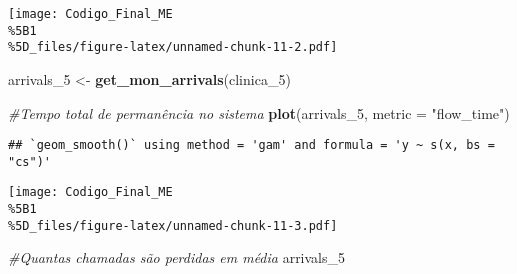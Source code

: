 \documentclass[
]{article}
\newenvironment{Shaded}{\begin{snugshade}}{\end{snugshade}}
\newcommand{\AttributeTok}[1]{\textcolor[rgb]{0.13,0.29,0.53}{#1}}
\newcommand{\CommentTok}[1]{\textcolor[rgb]{0.56,0.35,0.01}{\textit{#1}}}
\newcommand{\FunctionTok}[1]{\textcolor[rgb]{0.13,0.29,0.53}{\textbf{#1}}}
\newcommand{\NormalTok}[1]{#1}
\newcommand{\OtherTok}[1]{\textcolor[rgb]{0.56,0.35,0.01}{#1}}
\newcommand{\StringTok}[1]{\textcolor[rgb]{0.31,0.60,0.02}{#1}}
\begin{document}
\texttt{[image: Codigo\_Final\_ME\\\%5B1\\\%5D\_files/figure-latex/unnamed-chunk-11-2.pdf]}

\begin{Shaded}
\begin{Highlighting}[]
\NormalTok{arrivals\_5 }\OtherTok{\textless{}{-}} \FunctionTok{get\_mon\_arrivals}\NormalTok{(clinica\_5)}

\CommentTok{\#Tempo total de permanência no sistema}
\FunctionTok{plot}\NormalTok{(arrivals\_5, }\AttributeTok{metric =} \StringTok{"flow\_time"}\NormalTok{)  }
\end{Highlighting}
\end{Shaded}

\begin{verbatim}
## `geom_smooth()` using method = 'gam' and formula = 'y ~ s(x, bs = "cs")'
\end{verbatim}

\texttt{[image: Codigo\_Final\_ME\\\%5B1\\\%5D\_files/figure-latex/unnamed-chunk-11-3.pdf]}

\begin{Shaded}
\begin{Highlighting}[]
\CommentTok{\#Quantas chamadas são perdidas em média}
\NormalTok{arrivals\_5}
\end{Highlighting}
\end{Shaded}
\end{document}
